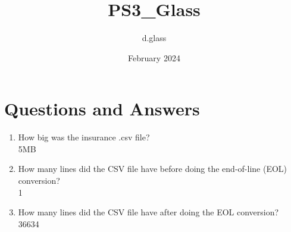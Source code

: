 \documentclass{article}
\title{PS3\_Glass}
\author{d.glass}
\date{February 2024}
\begin{document}
\maketitle



\section{Questions and Answers}
\begin{enumerate}
    \item How big was the insurance .csv file? \\
    5MB
    \item How many lines did the CSV file have before doing the end-of-line (EOL) conversion? \\
    1
    \item How many lines did the CSV file have after doing the EOL conversion? \\
    36634
\end{enumerate}
\end{document}
